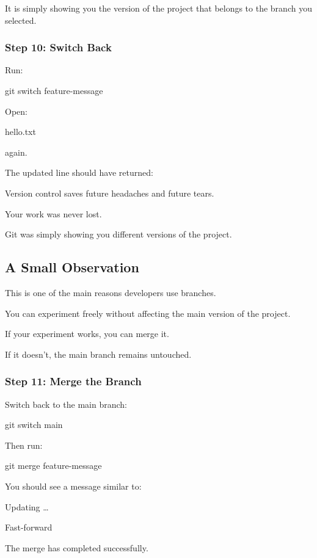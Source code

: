 \documentclass{csc2059practical}
\begin{document}
It is simply showing you the version of the project that belongs to the branch you selected.

\subsubsection{Step 10: Switch Back}
Run:

\begin{terminalplain}
git switch feature-message
\end{terminalplain}
Open:

\begin{terminalplain}
hello.txt
\end{terminalplain}
again.

The updated line should have returned:

\begin{terminalplain}
Version control saves future headaches and future tears.
\end{terminalplain}
Your work was never lost.

Git was simply showing you different versions of the project.

\subsection{A Small Observation}
This is one of the main reasons developers use branches.

You can experiment freely without affecting the main version of the project.

If your experiment works, you can merge it.

If it doesn't, the main branch remains untouched.

\subsubsection{Step 11: Merge the Branch}
Switch back to the main branch:

\begin{terminalplain}
git switch main
\end{terminalplain}
Then run:

\begin{terminalplain}
git merge feature-message
\end{terminalplain}
You should see a message similar to:

\begin{terminalplain}
Updating \ldots{}
\end{terminalplain}
\begin{terminalplain}
Fast-forward
\end{terminalplain}
The merge has completed successfully.
\end{document}
